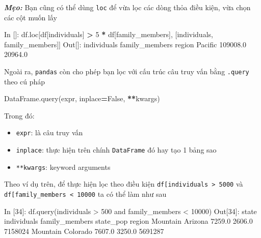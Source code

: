 \documentclass[
]{book}
\makeatletter
\newenvironment{Shaded}{\begin{snugshade}}{\end{snugshade}}
\newcommand{\DecValTok}[1]{\textcolor[rgb]{0.00,0.00,0.81}{#1}}
\newcommand{\FloatTok}[1]{\textcolor[rgb]{0.00,0.00,0.81}{#1}}
\newcommand{\NormalTok}[1]{#1}
\newcommand{\OperatorTok}[1]{\textcolor[rgb]{0.81,0.36,0.00}{\textbf{#1}}}
\newcommand{\StringTok}[1]{\textcolor[rgb]{0.31,0.60,0.02}{#1}}
\newcommand{\VariableTok}[1]{\textcolor[rgb]{0.00,0.00,0.00}{#1}}
\newenvironment{kframe}{%
\medskip{}
\setlength{\fboxsep}{.8em}
 \def\at@end@of@kframe{}%
 \ifinner\ifhmode%
  \def\at@end@of@kframe{\end{minipage}}%
  \begin{minipage}{\columnwidth}%
 \fi\fi%
 \def\FrameCommand##1{\hskip\@totalleftmargin \hskip-\fboxsep
 \colorbox{shadecolor}{##1}\hskip-\fboxsep
     \hskip-\linewidth \hskip-\@totalleftmargin \hskip\columnwidth}%
 \MakeFramed {\advance\hsize-\width
   \@totalleftmargin\z@ \linewidth\hsize
   \@setminipage}}%
 {\par\unskip\endMakeFramed%
 \at@end@of@kframe}
\newenvironment{rmdblock}[1]
  {
  \begin{itemize}
  \renewcommand{\labelitemi}{
    \raisebox{-.7\height}[0pt][0pt]{
      {\setkeys{Gin}{width=3em,keepaspectratio}\texttt{[image: images/\#1]}}
    }
  }
  \setlength{\fboxsep}{1em}
  \begin{kframe}
  \item
  }
  {
  \end{kframe}
  \end{itemize}
  }
\newenvironment{rmdtip}
  {\begin{rmdblock}{tip}}
  {\end{rmdblock}}
\makeatother
\begin{document}
\begin{rmdtip}
\textbf{\emph{Mẹo:}}
Bạn cũng có thể dùng \texttt{loc} để vừa lọc các dòng thỏa điều kiện, vừa chọn các cột muốn lấy
\end{rmdtip}

\begin{Shaded}
\begin{Highlighting}[]
\NormalTok{In []: df.loc[df[}\StringTok{\textquotesingle{}individuals\textquotesingle{}}\NormalTok{] }\OperatorTok{\textgreater{}} \DecValTok{5} \OperatorTok{*}\NormalTok{ df[}\StringTok{\textquotesingle{}family\_members\textquotesingle{}}\NormalTok{], [}\StringTok{\textquotesingle{}individuals\textquotesingle{}}\NormalTok{, }\StringTok{\textquotesingle{}family\_members\textquotesingle{}}\NormalTok{]]}
\NormalTok{Out[]:}
\NormalTok{         individuals  family\_members}
\NormalTok{region                              }
\NormalTok{Pacific     }\FloatTok{109008.0}         \FloatTok{20964.0}
\end{Highlighting}
\end{Shaded}

Ngoài ra, \texttt{pandas} còn cho phép bạn lọc với cấu trúc câu truy vấn bằng \texttt{.query} theo cú pháp

\begin{Shaded}
\begin{Highlighting}[]
\NormalTok{DataFrame.query(expr, inplace}\OperatorTok{=}\VariableTok{False}\NormalTok{, }\OperatorTok{**}\NormalTok{kwargs)}
\end{Highlighting}
\end{Shaded}

Trong đó:

\begin{itemize}
\item
  \texttt{expr}: là câu truy vấn
\item
  \texttt{inplace}: thực hiện trên chính \texttt{DataFrame} đó hay tạo 1 bảng sao
\item
  \texttt{**kwargs}: keyword arguments
\end{itemize}

Theo ví dụ trên, để thực hiện lọc theo điều kiện \texttt{df{[}\textquotesingle{}individuals\textquotesingle{}{]}\ \textgreater{}\ 5000} và \texttt{df{[}\textquotesingle{}family\_members\textquotesingle{}{]}\ \textless{}\ 10000} ta có thể làm như sau

\begin{Shaded}
\begin{Highlighting}[]
\NormalTok{In [}\DecValTok{34}\NormalTok{]: df.query(}\StringTok{\textquotesingle{}individuals \textgreater{} 500 and family\_members \textless{} 10000\textquotesingle{}}\NormalTok{)}
\NormalTok{Out[}\DecValTok{34}\NormalTok{]: }
\NormalTok{             state  individuals  family\_members  state\_pop}
\NormalTok{region                                                    }
\NormalTok{Mountain   Arizona       }\FloatTok{7259.0}          \FloatTok{2606.0}    \DecValTok{7158024}
\NormalTok{Mountain  Colorado       }\FloatTok{7607.0}          \FloatTok{3250.0}    \DecValTok{5691287}
\end{Highlighting}
\end{Shaded}
\end{document}
